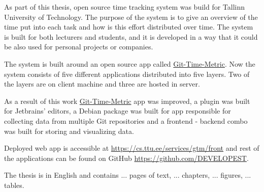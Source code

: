 As part of this thesis, open source time tracking system was build for Tallinn University of Technology.
The purpose of the system is to give an overview of the time put into each task and how is
this effort distributed over time.
The system is built for both lecturers and students, and it is developed in a way that it
could be also used for personal projects or companies.

The system is built around an open source app called \href{https://github.com/git-time-metric/gtm}{Git-Time-Metric}.
Now the system consists of five different applications distributed into five layers.
Two of the layers are on client machine and three are hosted in server.

As a result of this work \href{https://github.com/git-time-metric/gtm}{Git-Time-Metric} app was improved,
a plugin was built for Jetbrains' editors,
a Debian package was built for app responsible for collecting data from multiple Git repositories
and a frontend - backend combo was built for storing and visualizing data.

Deployed web app is accessible at \href{https://cs.ttu.ee/services/gtm/front}{https://cs.ttu.ee/services/gtm/front}
and rest of the applications can be found on GitHub \href{https://github.com/DEVELOPEST}{https://github.com/DEVELOPEST}.

The thesis is in English and contains ... pages of text, ... chapters, ... figures, ... tables.
